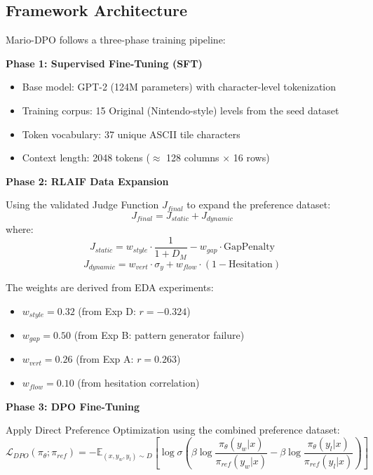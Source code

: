 \documentclass[11pt,a4paper]{article}
\theoremstyle{plain}
\theoremstyle{definition}
\theoremstyle{remark}
\begin{document}
\subsection{Framework Architecture}
\label{subsec:dpo-architecture}

Mario-DPO follows a three-phase training pipeline:

\textbf{Phase 1: Supervised Fine-Tuning (SFT)}
\begin{itemize}
    \item Base model: GPT-2 (124M parameters) with character-level tokenization
    \item Training corpus: 15 Original (Nintendo-style) levels from the seed dataset
    \item Token vocabulary: 37 unique ASCII tile characters
    \item Context length: 2048 tokens ($\approx$ 128 columns $\times$ 16 rows)
\end{itemize}

\textbf{Phase 2: RLAIF Data Expansion}

Using the validated Judge Function $J_{final}$ to expand the preference dataset:
\begin{equation}
J_{final} = J_{static} + J_{dynamic}
\end{equation}
where:
\begin{equation}
J_{static} = w_{style} \cdot \frac{1}{1 + D_M} - w_{gap} \cdot \text{GapPenalty}
\end{equation}
\begin{equation}
J_{dynamic} = w_{vert} \cdot \sigma_y + w_{flow} \cdot (1 - \text{Hesitation})
\end{equation}

The weights are derived from EDA experiments:
\begin{itemize}
    \item $w_{style} = 0.32$ (from Exp D: $r = -0.324$)
    \item $w_{gap} = 0.50$ (from Exp B: pattern generator failure)
    \item $w_{vert} = 0.26$ (from Exp A: $r = 0.263$)
    \item $w_{flow} = 0.10$ (from hesitation correlation)
\end{itemize}

\textbf{Phase 3: DPO Fine-Tuning}

Apply Direct Preference Optimization using the combined preference dataset:
\begin{equation}
\mathcal{L}_{DPO}(\pi_\theta; \pi_{ref}) = -\mathbb{E}_{(x, y_w, y_l) \sim D} \left[ \log \sigma \left( \beta \log \frac{\pi_\theta(y_w|x)}{\pi_{ref}(y_w|x)} - \beta \log \frac{\pi_\theta(y_l|x)}{\pi_{ref}(y_l|x)} \right) \right]
\end{equation}
\end{document}
